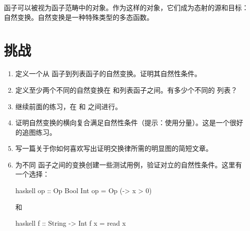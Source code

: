 函子可以被视为函子范畴中的对象。作为这样的对象，它们成为态射的源和目标：自然变换。自然变换是一种特殊类型的多态函数。

\section{挑战}

\begin{enumerate}
  \tightlist
  \item
  定义一个从  函子到列表函子的自然变换。证明其自然性条件。
  \item
  定义至少两个不同的自然变换在  和列表函子之间。有多少个不同的 \code{()} 列表？
  \item
  继续前面的练习，在  和  之间进行。
  \item
  证明自然变换的横向复合满足自然性条件（提示：使用分量）。这是一个很好的追图练习。
  \item
  写一篇关于你如何喜欢写出证明交换律所需的明显图的简短文章。
  \item
  为不同  函子之间的变换创建一些测试用例，验证对立的自然性条件。这里有一个选择：

  \begin{snip}{haskell}
    op :: Op Bool Int
    op = Op (\x -> x > 0)
  \end{snip}
  和

  \begin{snip}{haskell}
    f :: String -> Int
    f x = read x
  \end{snip}
\end{enumerate}
